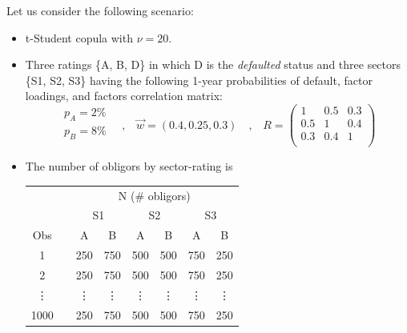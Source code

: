 \documentclass[11pt,fleqn]{book} %
\begin{document}
\begin{example}
	\label{ex:calib}
	Let us consider the following scenario:
	\begin{itemize}
		\item t-Student copula with $\nu=20$.
		\item Three ratings \{A, B, D\} in which D is the \emph{defaulted} status 
		and three sectors \{S1, S2, S3\} having the following 1-year probabilities 
		of default, factor loadings, and factors correlation matrix:
		\begin{displaymath}
			\begin{array}{l}
				p_A=2\%     \\
				p_B=8\%     \\
			\end{array}
			\quad \text{,} \quad
			\vec{w} = (0.4, 0.25, 0.3)
			\quad \text{,} \quad
			R = \left(
			\begin{array}{ccc}
				1 & 0.5 & 0.3 \\
				0.5 & 1 & 0.4 \\
				0.3 & 0.4 & 1 \\
			\end{array}
			\right) 
		\end{displaymath}
		\item The number of obligors by sector-rating is\\
		\newline
		\hspace*{1cm}
		\small
		\begin{tabular}{cc|c|c||c|c||c|c|}
			\cline{3-8}
			& & \multicolumn{6}{|c|}{N (\# obligors)} \\
			\cline{3-8}
			& & \multicolumn{2}{|c||}{S1} & \multicolumn{2}{|c||}{S2} & \multicolumn{2}{|c|}{S3} \\
			\cline{1-1} \cline{3-8}
			\multicolumn{1}{|c|}{Obs} & & A & B & A & B & A & B \\
			\cline{1-1} \cline{3-8}
			\multicolumn{1}{|c|}{1} & & 250 & 750 & 500 & 500 & 750 & 250 \\
			\cline{1-1} \cline{3-8}
			\multicolumn{1}{|c|}{2} & & 250 & 750 & 500 & 500 & 750 & 250 \\
			\cline{1-1} \cline{3-8}
			\multicolumn{1}{|c|}{\vdots} & & \vdots & \vdots & \vdots & \vdots & \vdots & \vdots \\
			\cline{1-1} \cline{3-8}
			\multicolumn{1}{|c|}{1000} & & 250 & 750 & 500 & 500 & 750 & 250 \\
			\cline{1-1} \cline{3-8}
		\end{tabular}
	\end{itemize}
	\vspace{11pt}


\end{example}
\end{document}
